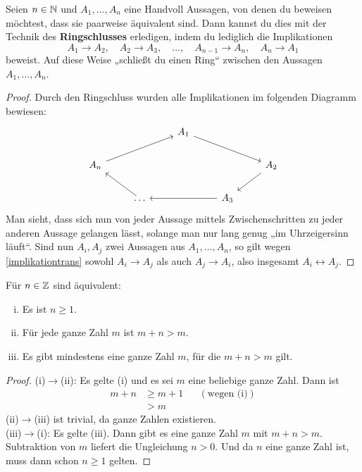 \begin{satz}[Ringschluss] \label{ringschluss} 
    Seien $n\in \mathbb N$ und $A_1,\dots , A_n$ eine Handvoll Aussagen, von denen du beweisen möchtest, dass sie paarweise äquivalent sind. Dann kannst du dies mit der Technik des \textbf{Ringschlusses} erledigen, indem du lediglich die Implikationen
        \[ A_1\to A_2,\quad A_2\to A_3,\quad \dots ,\quad A_{n-1}\to A_n,\quad A_n\to A_1 \]
    beweist. Auf diese Weise „schließt du einen Ring“ zwischen den Aussagen $A_1,\dots , A_n$.
\end{satz}
\begin{proof}
    Durch den Ringschluss wurden alle Implikationen im folgenden Diagramm bewiesen:
    \[\begin{tikzcd}
        &&& A_1 \ar[rrd] &&& \\
        &A_n\ar[rru]&&&& A_2 \ar[ld]& \\
        && \dots \ar[lu] && A_3 \ar[ll]&& 
    \end{tikzcd} \]
    Man sieht, dass sich nun von jeder Aussage mittels Zwischenschritten zu jeder anderen Aussage gelangen lässt, solange man nur lang genug „im Uhrzeigersinn läuft“. Sind nun $A_i,A_j$ zwei Aussagen aus $A_1,\dots , A_n$, so gilt wegen \cref{implikationtrans} sowohl $A_i\to A_j$ als auch $A_j\to A_i$, also insgesamt $A_i\leftrightarrow A_j$.
\end{proof}


\begin{bsp} \label{bsp:ringschluss}
    Für $n\in \mathbb Z$ sind äquivalent:
    \begin{enumerate}[(i)]
        \item Es ist $n\ge 1$.
        \item Für jede ganze Zahl $m$ ist $m+n>m$.
        \item Es gibt mindestens eine ganze Zahl $m$, für die $m+n>m$ gilt.
    \end{enumerate}
\end{bsp}
\begin{proof}
    (i)$\to$(ii): Es gelte (i) und es sei $m$ eine beliebige ganze Zahl. Dann ist
    \begin{align*}
        m+n & \ge m+1 && (\text{wegen (i)}) \\
        & > m
    \end{align*}
    (ii)$\to$(iii) ist trivial, da ganze Zahlen existieren. \\[0.5em]
    (iii)$\to$(i): Es gelte (iii). Dann gibt es eine ganze Zahl $m$ mit $m+n>m$. Subtraktion von $m$ liefert die Ungleichung $n>0$. Und da $n$ eine ganze Zahl ist, muss dann schon $n\ge 1$ gelten.
\end{proof}



